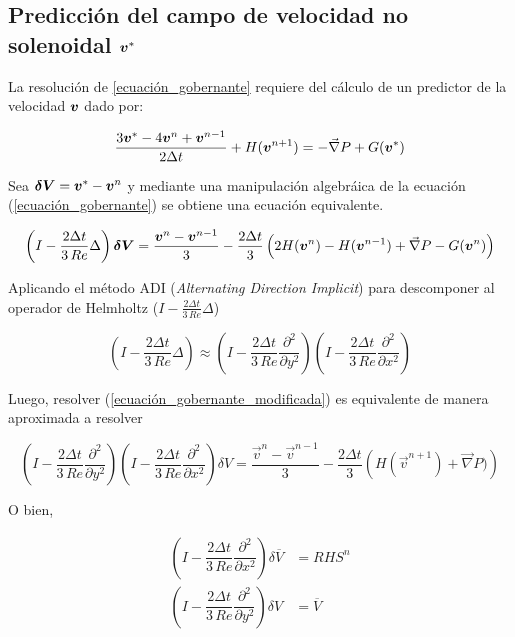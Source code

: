 \subsection{Predicción del campo de velocidad no solenoidal $\boldsymbol{v}^*$}

La resolución de \ref{ecuación_gobernante} requiere del cálculo de un predictor de la velocidad $\boldsymbol{v}$ dado por:

\begin{equation}
\dfrac{3 \boldsymbol{v}^{*} -4\boldsymbol{v}^n + \boldsymbol{v}^{n-1}}{2 \Delta t} + H(\boldsymbol{v}^{n+1}) = -\vec{\nabla} P + G(\boldsymbol{v}^{*})
\end{equation}

Sea $\boldsymbol{\delta V} = \boldsymbol{v}^* - \boldsymbol{v}^n $ y mediante una manipulación algebráica de la ecuación (\ref{ecuación_gobernante}) se obtiene una ecuación equivalente.

\begin{equation} \label{ecuación_gobernante_modificada}
\left( I - \dfrac{2 \Delta t}{3 \, Re} \Delta \right) \boldsymbol{\delta V} = \dfrac{\boldsymbol{v}^n-\boldsymbol{v}^{n-1}}{3} - \dfrac{2 \Delta t}{3} \left( 2 H(\boldsymbol{v}^n) - H(\boldsymbol{v}^{n-1}) + \vec{\nabla} P - G(\boldsymbol{v}^n) \right)
\end{equation} 

Aplicando el método ADI (\textit{Alternating Direction Implicit}) para descomponer al operador de Helmholtz ($I - \frac{2 \Delta t}{3 \, Re} \Delta $)

\begin{equation}
\left( I - \dfrac{2 \Delta t}{3 \, Re} \Delta \right) \approx \left( I - \dfrac{2 \Delta t}{3 \, Re} \dfrac{\partial^2}{\partial y^2} \right) \left( I - \dfrac{2 \Delta t}{3 \, Re} \dfrac{\partial^2}{\partial x^2} \right)
\end{equation}

Luego, resolver (\ref{ecuación_gobernante_modificada}) es equivalente de manera aproximada a resolver

\begin{equation}
\left( I - \dfrac{2 \Delta t}{3 \, Re} \dfrac{\partial^2}{\partial y^2} \right)  \left( I - \dfrac{2 \Delta t}{3 \, Re} \dfrac{\partial^2}{\partial x^2} \right) \delta V =  \dfrac{\vec{v}^n-\vec{v}^{n-1}}{3} - \dfrac{2 \Delta t}{3} \left( H(\vec{v}^{n+1}) + \vec{\nabla} P) \right)
\end{equation}

O bien,

\begin{align}
\left( I - \dfrac{2 \Delta t}{3 \, Re} \dfrac{\partial^2}{\partial x^2} \right) \delta \overline{V} &= RHS^n \label{primer_paso} \\ 
\left( I - \dfrac{2 \Delta t}{3 \, Re} \dfrac{\partial^2}{\partial y^2} \right) \delta V &= \overline{V} 
\end{align}

